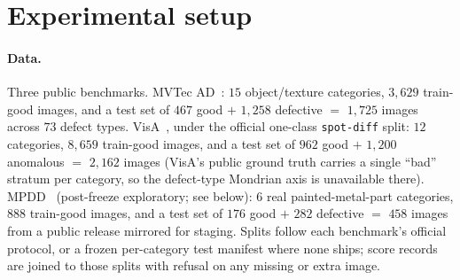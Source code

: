 \documentclass[preprint,11pt]{elsarticle}
\begin{document}
\section{Experimental setup}
\label{sec:setup}

\paragraph{Data.} Three public benchmarks. MVTec AD~\citep{bergmann2019mvtec}: $15$
object/texture categories, $3{,}629$ train-good images, and a test set of $467$ good $+$
$1{,}258$ defective $=$ $1{,}725$ images across $73$ defect types. VisA~\citep{zou2022spot},
under the official one-class \texttt{spot-diff} split: $12$ categories, $8{,}659$ train-good
images, and a test set of $962$ good $+$ $1{,}200$ anomalous $=$ $2{,}162$ images (VisA's
public ground truth carries a single ``bad'' stratum per category, so the defect-type Mondrian
axis is unavailable there). MPDD~\citep{jezek2021mpdd} (post-freeze exploratory; see below):
$6$ real painted-metal-part categories, $888$ train-good images, and a test set of $176$ good
$+$ $282$ defective $=$ $458$ images from a public release mirrored for staging. Splits follow
each benchmark's official protocol, or a frozen per-category test manifest where none ships;
score records are joined to those splits with refusal on any missing or extra image.
\end{document}
